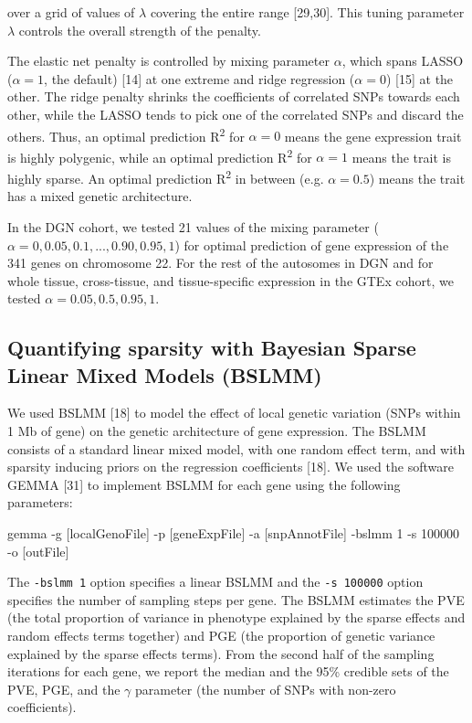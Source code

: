 \documentclass[]{article}
\newenvironment{Shaded}{\begin{snugshade}}{\end{snugshade}}
\newcommand{\DecValTok}[1]{\textcolor[rgb]{0.00,0.00,0.81}{{#1}}}
\newcommand{\NormalTok}[1]{{#1}}
\begin{document}
over a grid of values of \(\lambda\) covering the entire range
{[}29,30{]}. This tuning parameter \(\lambda\) controls the overall
strength of the penalty.

The elastic net penalty is controlled by mixing parameter \(\alpha\),
which spans LASSO (\(\alpha=1\), the default) {[}14{]} at one extreme
and ridge regression (\(\alpha=0\)) {[}15{]} at the other. The ridge
penalty shrinks the coefficients of correlated SNPs towards each other,
while the LASSO tends to pick one of the correlated SNPs and discard the
others. Thus, an optimal prediction R\textsuperscript{2} for
\(\alpha=0\) means the gene expression trait is highly polygenic, while
an optimal prediction R\textsuperscript{2} for \(\alpha=1\) means the
trait is highly sparse. An optimal prediction R\textsuperscript{2} in
between (e.g. \(\alpha=0.5\)) means the trait has a mixed genetic
architecture.

In the DGN cohort, we tested 21 values of the mixing parameter
(\(\alpha=0, 0.05, 0.1, ..., 0.90, 0.95, 1\)) for optimal prediction of
gene expression of the 341 genes on chromosome 22. For the rest of the
autosomes in DGN and for whole tissue, cross-tissue, and tissue-specific
expression in the GTEx cohort, we tested \(\alpha=0.05, 0.5, 0.95, 1\).

\subsection{Quantifying sparsity with Bayesian Sparse Linear Mixed
Models
(BSLMM)}\label{quantifying-sparsity-with-bayesian-sparse-linear-mixed-models-bslmm}

We used BSLMM {[}18{]} to model the effect of local genetic variation
(SNPs within 1 Mb of gene) on the genetic architecture of gene
expression. The BSLMM consists of a standard linear mixed model, with
one random effect term, and with sparsity inducing priors on the
regression coefficients {[}18{]}. We used the software GEMMA {[}31{]} to
implement BSLMM for each gene using the following parameters:

\begin{Shaded}
\begin{Highlighting}[]
\NormalTok{gemma -g [localGenoFile] -p [geneExpFile] -a [snpAnnotFile] -bslmm }\DecValTok{1} \NormalTok{-s }\DecValTok{100000} \NormalTok{-o [outFile]}
\end{Highlighting}
\end{Shaded}

The \texttt{-bslmm 1} option specifies a linear BSLMM and the
\texttt{-s 100000} option specifies the number of sampling steps per
gene. The BSLMM estimates the PVE (the total proportion of variance in
phenotype explained by the sparse effects and random effects terms
together) and PGE (the proportion of genetic variance explained by the
sparse effects terms). From the second half of the sampling iterations
for each gene, we report the median and the 95\% credible sets of the
PVE, PGE, and the \textbar{}\(\gamma\)\textbar{} parameter (the number
of SNPs with non-zero coefficients).
\end{document}
